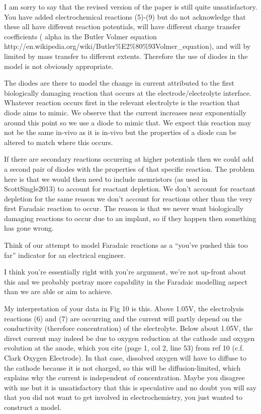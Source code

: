 \documentclass[journal, a4paper]{IEEEtran}
\begin{document}
{\color{OliveGreen}
    I am sorry to say that the revised version of the paper is still quite unsatisfactory. You have added electrochemical reactions (5)-(9) but do not acknowledge that these all have different reaction potentials, will have different charge transfer coefficients ( alpha in the Butler Volmer equation http://en.wikipedia.org/wiki/Butler\%E2\%80\%93Volmer\_equation), and will by limited by mass transfer to different extents. Therefore the use of diodes in the model is not obviously appropriate.

    {\color{blue}
        The diodes are there to model the change in current attributed to the first biologically damaging reaction that occurs at the electrode/electrolyte interface. Whatever reaction occurs first in the relevant electrolyte is the reaction that diode aims to mimic. We observe that the current increases near exponentially around this point so we use a diode to mimic that. We expect this reaction may not be the same in-vivo as it is in-vivo but the properties of a diode can be altered to match where this occurs.

        If there are secondary reactions occurring at higher potentials then we could add a second pair of diodes with the properties of that specific reaction. The problem here is that we would then need to include memristors (as used in ScottSingle2013) to account for reactant depletion. We don't account for reactant depletion for the same reason we don't account for reactions other than the very first Faradaic reaction to occur. The reason is that we never want biologically damaging reactions to occur due to an implant, so if they happen then something has gone wrong.

        Think of our attempt to model Faradaic reactions as a ``you've pushed this too far'' indicator for an electrical engineer.

        I think you're essentially right with you're argument, we're not up-front about this and we probably portray more capability in the Faradaic modelling aspect than we are able or aim to achieve.
    }

    My interpretation of your data in Fig 10 is this. Above 1.05V, the electrolysis reactions (6) and (7) are occurring and the current will partly depend on the conductivity (therefore concentration) of the electrolyte. Below about 1.05V, the direct current may indeed be due to oxygen reduction at the cathode and oxygen evolution at the anode, which you cite (page 1, col 2, line 53) from ref 10 (c.f. Clark Oxygen Electrode). In that case, dissolved oxygen will have to diffuse to the cathode because it is not charged, so this will be diffusion-limited, which explains why the current is independent of concentration. Maybe you disagree with me but it is unsatisfactory that this is speculative and no doubt you will say that you did not want to get involved in electrochemistry, you just wanted to construct a model.

}
\end{document}
